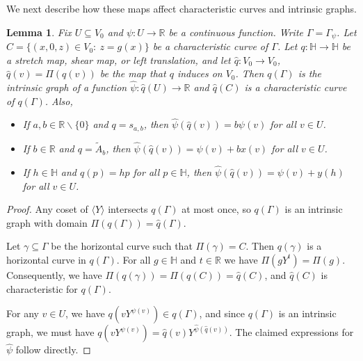 \documentclass[11pt,reqno]{amsart}
\renewcommand{\H}{\mathbb{H}}
\newcommand{\R}{\mathbb{R}}
\newcommand{\0}{\mathbf{0}}
\renewcommand{\1}{\mathbf 1}
\newcommand{\from}{\colon}
\renewcommand{\subset}{\subseteq}
\renewcommand{\setminus}{\smallsetminus}
\newtheorem{lemma}[thm]{Lemma}
\theoremstyle{remark}
\begin{document}
We next describe how these maps affect characteristic curves and intrinsic graphs.
\begin{lemma}\label{lem:curve transforms} Fix $U\subset V_0$ and $\psi\from U\to \R$ be a continuous function. Write $\Gamma=\Gamma_\psi$. Let $C=\{(x,0,z)\in V_0:\ z=g(x)\}$ be a characteristic curve of $\Gamma$.  Let $q\from \H\to \H$ be a stretch map, shear map, or left translation, and let $\hat{q}\from V_0\to V_0$, $\hat{q}(v)=\Pi(q(v))$ be the map that $q$ induces on $V_0$.  Then $q(\Gamma)$ is the intrinsic graph of a function $\hat{\psi}\from \hat{q}(U)\to \R$ and $\hat{q}(C)$ is a characteristic curve of $q(\Gamma)$. Also,
\begin{itemize}
\item  If $a, b\in \R\setminus \{0\}$ and $q=s_{a,b}$, then $\hat{\psi}(\hat{q}(v))=b \psi(v)$ for all $v\in U$.

\item  If $b\in \R$ and $q=\tilde{A}_b$, then $\hat{\psi}(\hat{q}(v))=\psi(v)+bx(v)$ for all $v\in U$.

 \item  If $h\in \H$ and $q(p)=hp$ for all $p\in \H$, then $\hat{\psi}(\hat{q}(v))=\psi(v)+y(h)$ for all $v\in U$.
  \end{itemize}
\end{lemma}
\begin{proof}
  Any coset of $\langle Y\rangle$ intersects $q(\Gamma)$ at most once, so $q(\Gamma)$ is an intrinsic graph with domain $\Pi(q(\Gamma))=\hat{q}(\Gamma)$.

  Let $\gamma\subset \Gamma$ be the horizontal curve such that $\Pi(\gamma)=C$.  Then $q(\gamma)$ is a horizontal curve in $q(\Gamma)$.  For all $g\in \H$ and $t\in \R$ we have $\Pi(gY^t)=\Pi(g)$. Consequently, we have $\Pi(q(\gamma))=\Pi(q(C))=\hat{q}(C)$, and $\hat{q}(C)$ is characteristic for $q(\Gamma)$.

  For any $v\in U$, we have $q(vY^{\psi(v)})\in q(\Gamma)$, and since $q(\Gamma)$ is an intrinsic graph, we must have $q(vY^{\psi(v)})=\hat{q}(v) Y^{\hat{\psi}(\hat{q}(v))}$.  The claimed expressions for $\hat{\psi}$ follow directly.
\end{proof}
\end{document}
